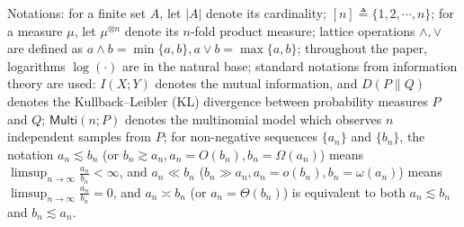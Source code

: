 \documentclass[final,12pt]{colt2018} %
\begin{document}

Notations: for a finite set $A$, let $|A|$ denote its cardinality; $[n]\triangleq \{1,2,\cdots,n\}$; for a measure $\mu$, let $\mu^{\otimes n}$ denote its $n$-fold product measure; lattice operations $\wedge, \vee$ are defined as $a\wedge b=\min\{a,b\}, a\vee b=\max\{a,b\}$; throughout the paper, logarithms $\log(\cdot)$ are in the natural base; standard notations from information theory are used: $ I(X;Y)$ denotes the mutual information, and $D(P\|Q)$ denotes the Kullback--Leibler (KL) divergence between probability measures $P$ and $Q$; $\mathsf{Multi}(n;P)$ denotes the multinomial model which observes $n$ independent samples from $P$; for non-negative sequences $\{a_n\}$ and $\{b_n\}$, the notation $a_n\lesssim b_n$ (or $b_n\gtrsim a_n, a_n=O(b_n), b_n=\Omega(a_n)$) means $\limsup_{n\to\infty} \frac{a_n}{b_n}<\infty$, and $a_n\ll b_n$ ($b_n\gg a_n, a_n=o(b_n), b_n=\omega(a_n)$) means $\limsup_{n\to\infty}\frac{a_n}{b_n}=0$, and $a_n\asymp b_n$ (or $a_n=\Theta(b_n)$) is equivalent to both $a_n\lesssim b_n$ and $b_n\lesssim a_n$.
\end{document}
